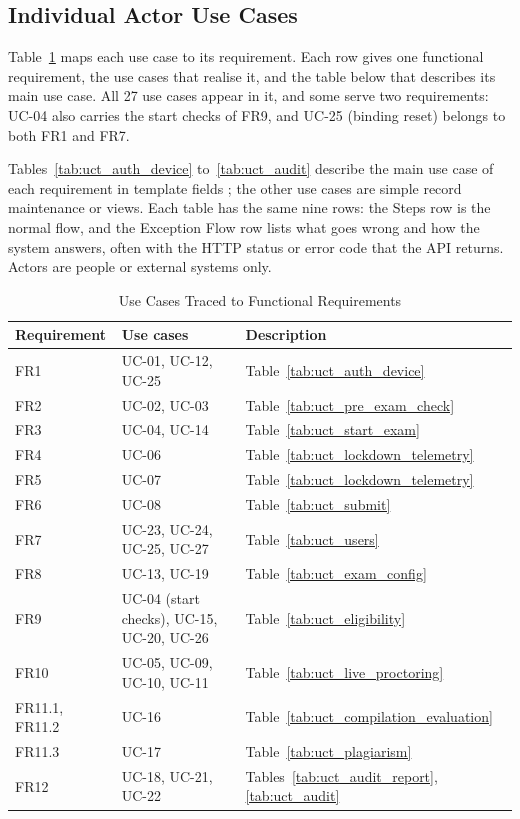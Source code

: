 \subsection{Individual Actor Use Cases}

Table~\ref{tab:uc_trace} maps each use case to its requirement. Each row gives one functional requirement, the use cases that realise it, and the table below that describes its main use case. All 27 use cases appear in it, and some serve two requirements: UC-04 also carries the start checks of FR9, and UC-25 (binding reset) belongs to both FR1 and FR7.

Tables~\ref{tab:uct_auth_device} to~\ref{tab:uct_audit} describe the main use case of each requirement in template fields \cite{use_case_definition}; the other use cases are simple record maintenance or views. Each table has the same nine rows: the Steps row is the normal flow, and the Exception Flow row lists what goes wrong and how the system answers, often with the HTTP status or error code that the API returns. Actors are people or external systems only.

\begin{table}[H]
\centering
\caption{Use Cases Traced to Functional Requirements}
\label{tab:uc_trace}
{\footnotesize\renewcommand{\arraystretch}{0.9}
\begin{tabularx}{\textwidth}{>{\raggedright\arraybackslash}p{3.0cm}>{\raggedright\arraybackslash}X>{\raggedright\arraybackslash}p{3.4cm}}
\hline\hline
\textbf{Requirement} & \textbf{Use cases} & \textbf{Description} \\
\hline
FR1 & UC-01, UC-12, UC-25 & Table~\ref{tab:uct_auth_device} \\
FR2 & UC-02, UC-03 & Table~\ref{tab:uct_pre_exam_check} \\
FR3 & UC-04, UC-14 & Table~\ref{tab:uct_start_exam} \\
FR4 & UC-06 & Table~\ref{tab:uct_lockdown_telemetry} \\
FR5 & UC-07 & Table~\ref{tab:uct_lockdown_telemetry} \\
FR6 & UC-08 & Table~\ref{tab:uct_submit} \\
FR7 & UC-23, UC-24, UC-25, UC-27 & Table~\ref{tab:uct_users} \\
FR8 & UC-13, UC-19 & Table~\ref{tab:uct_exam_config} \\
FR9 & UC-04 (start checks), UC-15, UC-20, UC-26 & Table~\ref{tab:uct_eligibility} \\
FR10 & UC-05, UC-09, UC-10, UC-11 & Table~\ref{tab:uct_live_proctoring} \\
FR11.1, FR11.2 & UC-16 & Table~\ref{tab:uct_compilation_evaluation} \\
FR11.3 & UC-17 & Table~\ref{tab:uct_plagiarism} \\
FR12 & UC-18, UC-21, UC-22 & Tables~\ref{tab:uct_audit_report}, \ref{tab:uct_audit} \\
\hline\hline
\end{tabularx}}
\end{table}


